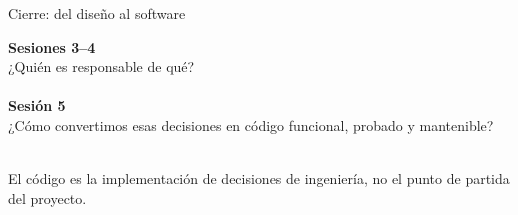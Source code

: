 \documentclass[11pt,aspectratio=169]{beamer}
\begin{document}
\begin{frame}{Cierre: del diseño al software}
\begin{center}
  {\Large\textbf{Sesiones 3--4}}\\[0.2em]
  ¿Quién es responsable de qué?\\[0.4em]
  \large\arr\\[0.4em]
  {\Large\textbf{Sesión 5}}\\[0.2em]
  ¿Cómo convertimos esas decisiones en código funcional, probado y mantenible?\\[0.4em]
  \large\arr\\[0.4em]
  {\Large{}}
\end{center}

\begin{statement}
  El código es la implementación de decisiones de ingeniería, no el punto de
  partida del proyecto.
\end{statement}
\end{frame}
\end{document}
